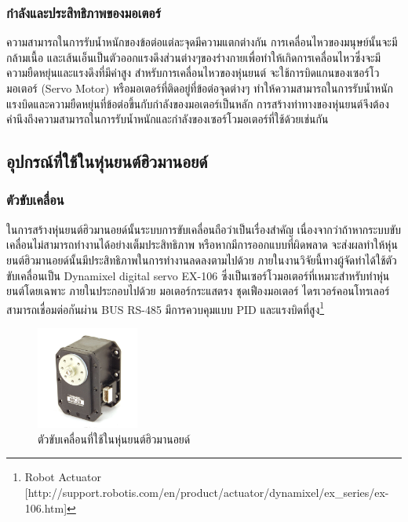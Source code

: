 \subsubsection{กำลังและประสิทธิภาพของมอเตอร์}
ความสามารถในการรับน้ำหนักของข้อต่อแต่ละจุดมีความแตกต่างกัน การเคลื่อนไหวของมนุษย์นั้นจะมีกล้ามเนื้อ
และเส้นเอ็นเป็นตัวออกแรงดึงส่วนต่างๆของร่างกายเพื่อทำให้เกิดการเคลื่อนไหวซึ่งจะมีความยืดหยุ่นและแรงดึงที่มีค่าสูง
สำหรับการเคลื่อนไหวของหุ่นยนต์ จะใช้การบิดแกนของเซอร์โวมอเตอร์ (Servo Motor) หรือมอเตอร์ที่ติดอยู่ที่ข้อต่อจุดต่างๆ
ทำให้ความสามารถในการรับน้ำหนัก แรงบิดและความยืดหยุ่นที่ข้อต่อขึ้นกับกำลังของมอเตอร์เป็นหลัก
การสร้างท่าทางของหุ่นยนต์จึงต้องคำนึงถึงความสามารถในการรับน้ำหนักและกำลังของเซอร์โวมอเตอร์ที่ใช้ด้วยเช่นกัน


\subsection{อุปกรณ์ที่ใช้ในหุ่นยนต์ฮิวมานอยด์}

\subsubsection*{ตัวขับเคลื่อน}
ในการสร้างหุ่นยนต์ฮิวมานอยด์นั้นระบบการขับเคลื่อนถือว่าเป็นเรื่องสำคัญ เนื่องจากว่าถ้าหากระบบขับเคลื่อนไม่สามารถทำงานได้อย่างเต็มประสิทธิภาพ
หรือหากมีการออกแบบที่ผิดพลาด จะส่งผลทำให้หุ่นยนต์ฮิวมานอยด์นั้นมีประสิทธิภาพในการทำงานลดลงตามไปด้วย ภายในงานวิจัยนี้ทางผู้จัดทำได้ใช้ตัวขับเคลื่อนเป็น
Dynamixel digital servo EX-106 ซึ่งเป็นเซอร์โวมอเตอร์ที่เหมาะสำหรับทำหุ่นยนต์โดยเฉพาะ ภายในประกอบไปด้วย มอเตอร์กระแสตรง ชุดเฟืองมอเตอร์
ไดรเวอร์คอนโทรเลอร์ สามารถเชื่อมต่อกันผ่าน BUS RS-485 มีการควบคุมแบบ PID และแรงบิดที่สูง\footnote{ Robot Actuator [http://support.robotis.com/en/product/actuator/dynamixel/ex\_series/ex-106.htm] }

\begin{figure}[!ht]
    \centering
    \includegraphics[width=0.3\textwidth]{chapter2/images/actuator_robot.jpg}
    \caption{ตัวขับเคลื่อนที่ใช้ในหุ่นยนต์ฮิวมานอยด์}
    \label{fig:actuator_robot}
\end{figure}

